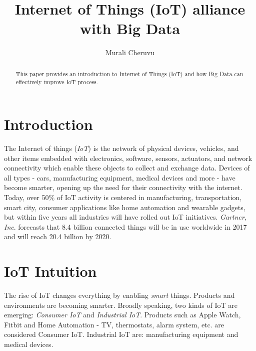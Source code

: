 \documentclass[sigconf]{acmart}
\begin{document}
\title{Internet of Things (IoT) alliance with Big Data}


\author{Murali Cheruvu}

\renewcommand{\shortauthors}{M. Cheruvu}


\begin{abstract}
This paper provides an introduction to Internet of Things (IoT) and how Big Data can effectively improve IoT process.
\end{abstract}



\maketitle

\section{Introduction}

The Internet of things ({\em IoT}) is the network of physical devices, vehicles, and other items embedded with electronics, software, sensors, actuators, and network connectivity which enable these objects to collect and exchange data\cite{1_wiki_iot}. Devices of all types - cars, manufacturing equipment, medical devices and more - have become smarter, opening up the need for their connectivity with the internet. Today, over 50\% of IoT activity is centered in manufacturing, transportation, smart city, consumer applications like home automation and wearable gadgets, but within five years all industries will have rolled out IoT initiatives. {\em Gartner, Inc}. forecasts that 8.4 billion connected things will be in use worldwide in 2017 and will reach 20.4 billion by 2020\cite{2_Gartner}. 

\section{IoT Intuition}

The rise of IoT changes everything by enabling {\em smart} things. Products and environments are becoming smarter. Broadly speaking, two kinds of IoT are emerging: {\em Consumer IoT} and {\em Industrial IoT}. Products such as Apple Watch, Fitbit and Home Automation - TV, thermostats, alarm system, etc. are considered Consumer IoT. Industrial IoT are: manufacturing equipment and medical devices.
\end{document}
